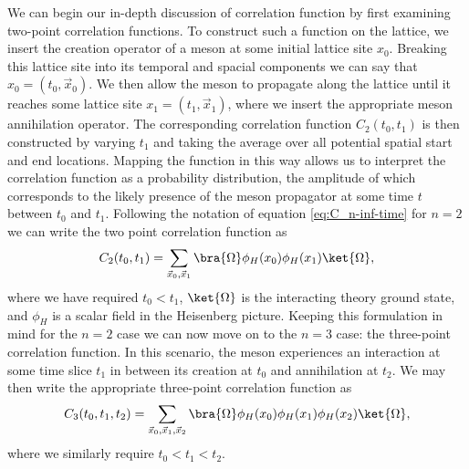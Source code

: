 We can begin our in-depth discussion of correlation function by first examining two-point correlation functions.  To construct such a function on the lattice, we insert the creation operator of a meson at some initial lattice site $x_0$.  Breaking this lattice site into its temporal and spacial components we can say that $x_0 = (t_0,\vec{x}_0)$.  We then allow the meson to propagate along the lattice until it reaches some lattice site $x_1 = (t_1,\vec{x}_1)$, where we insert the appropriate meson annihilation operator.  The corresponding correlation function $C_2(t_0,t_1)$ is then constructed by varying $t_1$ and taking the average over all potential spatial start and end locations.  Mapping the function in this way allows us to interpret the correlation function as a probability distribution, the amplitude of which corresponds to the likely presence of the meson propagator at some time $t$ between $t_0$ and $t_1$.  Following the notation of equation \ref{eq:C_n-inf-time} for $n=2$ we can write the two point correlation function as
\begin{equation}\label{eq:cha3_2ptcorr}
    C_2 (t_0, t_1) = \sum_{\vec x_0, \vec x_1} \bra{\Omega}\phi_H(x_0)\phi_H(x_1)\ket{\Omega},
\end{equation}
where we have required $t_0 < t_1$, $\ket{\Omega}$ is the interacting theory ground state, and $\phi_H$ is a scalar field in the Heisenberg picture.  Keeping this formulation in mind for the $n=2$ case we can now move on to the $n=3$ case: the three-point correlation function.  In this scenario, the meson experiences an interaction at some time slice $t_1$ in between its creation at $t_0$ and annihilation at $t_2$. We may then write the appropriate three-point correlation function as
\begin{equation}\label{eq:cha3_3ptcorr}
    C_3 (t_0, t_1, t_2) = \sum_{\vec x_0, \vec x_1, \vec x_2} \bra{\Omega}\phi_H(x_0)\phi_H(x_1)\phi_H(x_2)\ket{\Omega},
\end{equation}
where we similarly require $t_0 < t_1 < t_2$.

